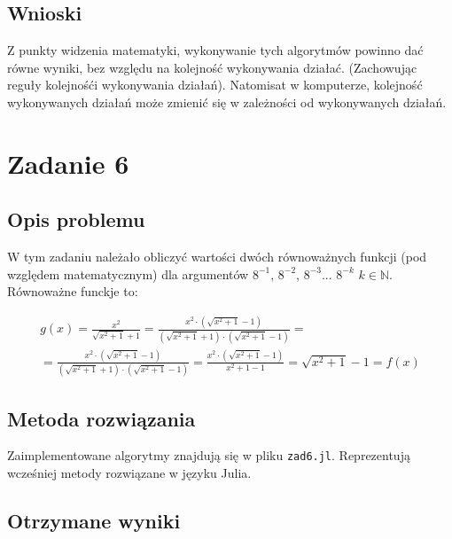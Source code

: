 \documentclass{article}
\begin{document}
\subsection{Wnioski}

Z punkty widzenia matematyki, wykonywanie tych algorytmów powinno dać równe wyniki, bez względu na kolejność wykonywania działać. (Zachowując reguły kolejnośći wykonywania działań). Natomisat w komputerze, kolejność wykonywanych działań może zmienić się w zależności od wykonywanych działań.

\section{Zadanie 6}

\subsection{Opis problemu}

W tym zadaniu należało obliczyć wartości dwóch równoważnych funkcji (pod względem matematycznym) dla argumentów \(8^{-1}\), \(8^{-2}\), \(8^{-3}\)... \(8^{-k}\) \(k \in \mathbb{N}\). Równoważne funckje to:

\begin{multline}
    g(x) = \frac{x^2}{\sqrt{x^2 + 1} + 1}  = \frac{x^2 \cdot (\sqrt{x^2 +1 } - 1)}{(\sqrt{x^2+1} + 1)\cdot(\sqrt{x^2+1} - 1)}  =  \\  = \frac{x^2 \cdot (\sqrt{x^2 +1 } - 1)}{(\sqrt{x^2+1} + 1)\cdot(\sqrt{x^2+1} - 1)} = \frac{x^2 \cdot (\sqrt{x^2+1}-1)}{x^2 + 1 - 1} = \sqrt{x^2+1} - 1 = f(x)
\end{multline}

\subsection{Metoda rozwiązania}

Zaimplementowane algorytmy znajdują się w pliku \texttt{zad6.jl}. Reprezentują wcześniej metody rozwiązane w języku Julia.

\subsection{Otrzymane wyniki}
\end{document}
